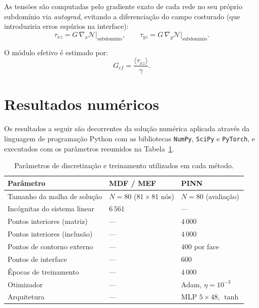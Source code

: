 \documentclass[brazil]{TCAM} %
\begin{document}
As tensões são computadas pelo gradiente exato de cada rede no seu próprio
subdomínio via \textit{autograd}, evitando a diferenciação do campo costurado
(que introduziria erros espúrios na interface):
\begin{equation*}
    \tau_{xz} = G\,\nabla_x \mathcal{N}\big|_{\text{subdomínio}}, \qquad
    \tau_{yz} = G\,\nabla_y \mathcal{N}\big|_{\text{subdomínio}}.
\end{equation*}

O módulo efetivo é estimado por:
\begin{equation*}
    G_{ef} = \frac{\langle \tau_{xz} \rangle}{\gamma}.
\end{equation*}

\section{Resultados numéricos}

Os resultados a seguir são decorrentes da solução numérica aplicada através da linguagem de programação Python com as bibliotecas \texttt{NumPy},
\texttt{SciPy} e \texttt{PyTorch}, e executados com os parâmetros resumidos na
Tabela~\ref{tab:params}.

\begin{table}[h]
\centering
\caption{Parâmetros de discretização e treinamento utilizados em cada método.}
\label{tab:params}
\begin{tabular}{lll}
\hline
\textbf{Parâmetro} & \textbf{MDF / MEF} & \textbf{PINN} \\
\hline
Tamanho da malha de solução    & $N = 80$ ($81{\times}81$ nós) & $N = 80$ (avaliação) \\
Incógnitas do sistema linear   & $6\,561$                      & ---                  \\
Pontos interiores (matriz)     & ---                           & $4\,000$             \\
Pontos interiores (inclusão)   & ---                           & $4\,000$             \\
Pontos de contorno externo     & ---                           & $400$ por face       \\
Pontos de interface            & ---                           & $600$                \\
Épocas de treinamento          & ---                           & $4\,000$             \\
Otimizador                     & ---                           & Adam, $\eta=10^{-3}$ \\
Arquitetura                    & ---                           & MLP $5{\times}48$, $\tanh$ \\
\hline
\end{tabular}
\end{table}
\end{document}
